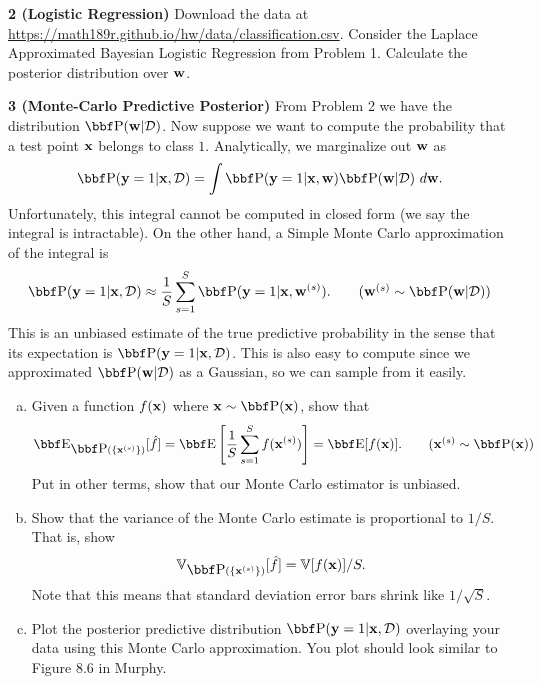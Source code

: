 \documentclass[12pt,letterpaper,fleqn]{hmcpset}
\begin{document}
\newpage

\textbf{2 (Logistic Regression)} Download the data at
\url{https://math189r.github.io/hw/data/classification.csv}. Consider the Laplace Approximated
Bayesian Logistic Regression from Problem 1. Calculate the posterior distribution
over ${\bf w}$.

\newpage

\textbf{3 (Monte-Carlo Predictive Posterior)} From Problem 2 we have the distribution
$\PP(\ww|\Dc)$. Now suppose we want to compute the probability that a test point ${\bf x}$
belongs to class $1$. Analytically, we marginalize out ${\bf w}$ as
\[
    \PP(\yy=1|\xx,\Dc) = \int \PP(\yy=1|\xx,\ww)\PP(\ww|\Dc)~d\ww.
\]
Unfortunately, this integral cannot be computed in closed form (we say the integral is
intractable). On the other hand, a Simple Monte Carlo approximation of the integral is
\begin{align*}
    \PP(\yy=1|\xx,\Dc) \approx \frac{1}{S}\sum_{s=1}^S \PP(\yy=1|\xx,\ww^{(s)}).\tag{$\ww^{(s)}\sim\PP(\ww|\Dc)$}
\end{align*}
This is an unbiased estimate of the true predictive probability in the sense that its expectation
is $\PP(\yy=1|\xx,\Dc)$. This is also easy to compute since we approximated $\PP(\ww|\Dc)$ as
a Gaussian, so we can sample from it easily.
\begin{enumerate}[(a)]
    \item Given a function $f({\bf x})$ where $\xx\sim \PP(\xx)$, show that
        \begin{align*}
            \EE_{\PP(\{\xx^{(s)}\})}[\hat f] = \EE\left[\frac{1}{S}\sum_{s=1}^S f(\xx^{(s)})\right] = \EE[f(\xx)].\tag{$\xx^{(s)}\sim\PP(\xx)$}
        \end{align*}
        Put in other terms, show that our Monte Carlo estimator is unbiased.
    \item Show that the variance of the Monte Carlo estimate is proportional to
        $1/S$. That is, show
        \begin{align*}
            \mathbb{V}_{\PP(\{\xx^{(s)}\})}[\hat f] = \mathbb{V}[f(\xx)]/S.
        \end{align*}
        Note that this means that standard deviation error bars shrink like $1/\sqrt{S}$.
    \item Plot the posterior predictive distribution $\PP(\yy=1|\xx,\Dc)$ overlaying your data
        using this Monte Carlo approximation. You plot should look similar to Figure 8.6 in
        Murphy.
\end{enumerate}
\end{document}

